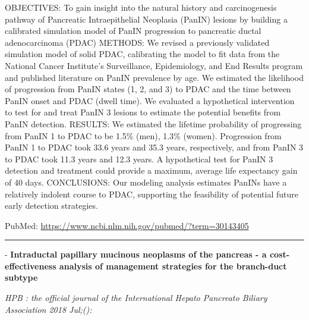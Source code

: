 \documentclass[]{article}
\begin{document}
OBJECTIVES: To gain insight into the natural history and carcinogenesis
pathway of Pancreatic Intraepithelial Neoplasia (PanIN) lesions by
building a calibrated simulation model of PanIN progression to
pancreatic ductal adenocarcinoma (PDAC) METHODS: We revised a previously
validated simulation model of solid PDAC, calibrating the model to fit
data from the National Cancer Institute's Surveillance, Epidemiology,
and End Results program and published literature on PanIN prevalence by
age. We estimated the likelihood of progression from PanIN states (1, 2,
and 3) to PDAC and the time between PanIN onset and PDAC (dwell time).
We evaluated a hypothetical intervention to test for and treat PanIN 3
lesions to estimate the potential benefits from PanIN detection.
RESULTS: We estimated the lifetime probability of progressing from PanIN
1 to PDAC to be 1.5\% (men), 1.3\% (women). Progression from PanIN 1 to
PDAC took 33.6 years and 35.3 years, respectively, and from PanIN 3 to
PDAC took 11.3 years and 12.3 years. A hypothetical test for PanIN 3
detection and treatment could provide a maximum, average life expectancy
gain of 40 days. CONCLUSIONS: Our modeling analysis estimates PanINs
have a relatively indolent course to PDAC, supporting the feasibility of
potential future early detection strategies.

PubMed: \url{https://www.ncbi.nlm.nih.gov/pubmed/?term=30143405}

{}

{}

\begin{center}\rule{0.5\linewidth}{\linethickness}\end{center}

 - \textbf{Intraductal papillary mucinous neoplasms of the pancreas - a
cost-effectiveness analysis of management strategies for the branch-duct
subtype}

\emph{HPB : the official journal of the International Hepato Pancreato
Biliary Association 2018 Jul;():}
\end{document}
